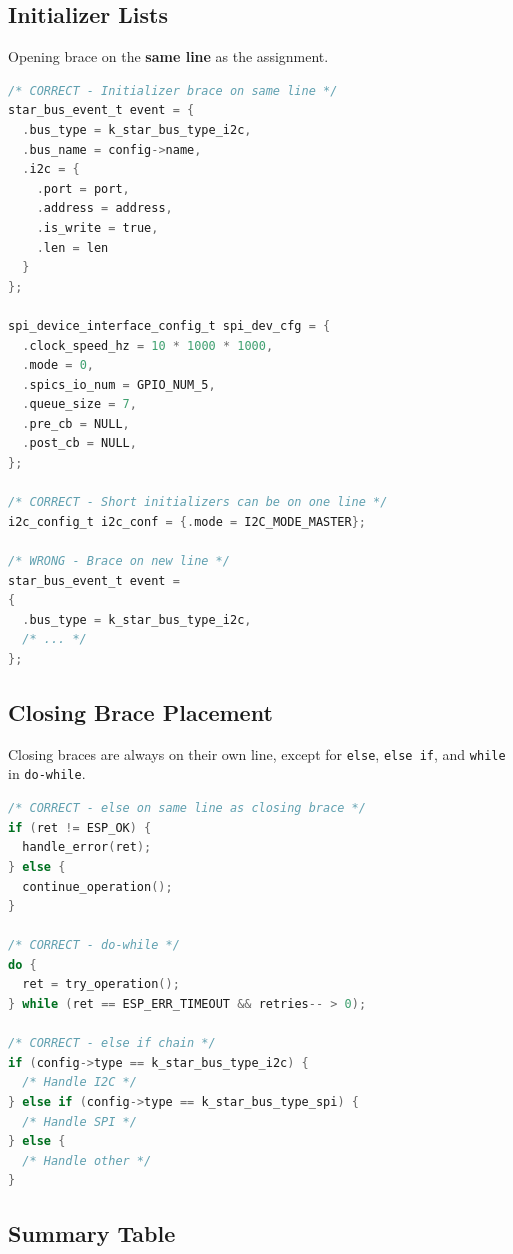 \subsection{Initializer Lists}

Opening brace on the \textbf{same line} as the assignment.

\begin{lstlisting}[language=C]
/* CORRECT - Initializer brace on same line */
star_bus_event_t event = {
  .bus_type = k_star_bus_type_i2c,
  .bus_name = config->name,
  .i2c = {
    .port = port,
    .address = address,
    .is_write = true,
    .len = len
  }
};

spi_device_interface_config_t spi_dev_cfg = {
  .clock_speed_hz = 10 * 1000 * 1000,
  .mode = 0,
  .spics_io_num = GPIO_NUM_5,
  .queue_size = 7,
  .pre_cb = NULL,
  .post_cb = NULL,
};

/* CORRECT - Short initializers can be on one line */
i2c_config_t i2c_conf = {.mode = I2C_MODE_MASTER};

/* WRONG - Brace on new line */
star_bus_event_t event =
{
  .bus_type = k_star_bus_type_i2c,
  /* ... */
};
\end{lstlisting}

\subsection{Closing Brace Placement}

Closing braces are always on their own line, except for \texttt{else}, \texttt{else if}, and \texttt{while} in \texttt{do-while}.

\begin{lstlisting}[language=C]
/* CORRECT - else on same line as closing brace */
if (ret != ESP_OK) {
  handle_error(ret);
} else {
  continue_operation();
}

/* CORRECT - do-while */
do {
  ret = try_operation();
} while (ret == ESP_ERR_TIMEOUT && retries-- > 0);

/* CORRECT - else if chain */
if (config->type == k_star_bus_type_i2c) {
  /* Handle I2C */
} else if (config->type == k_star_bus_type_spi) {
  /* Handle SPI */
} else {
  /* Handle other */
}
\end{lstlisting}

\subsection{Summary Table}

